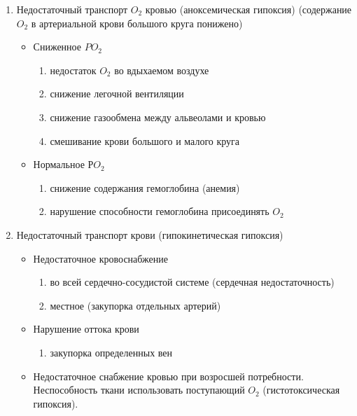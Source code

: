 \documentclass[a4paper,14pt]{extreport}
\begin{document}
\begin{enumerate}
    \item { Недостаточный транспорт $O_2$ кровью (аноксемическая гипоксия) (содержание $O_2$ в артериальной крови большого круга понижено)
        \begin{itemize}
        \item {Сниженное $PO_2$
        \begin{enumerate}
            \item недостаток $O_2$ во вдыхаемом воздухе
            \item снижение легочной вентиляции
            \item снижение газообмена между альвеолами и кровью
            \item смешивание крови большого и малого круга
        \end{enumerate}
        }
        \item {Нормальное $РO_2$
        \begin{enumerate}
            \item снижение содержания гемоглобина (анемия)
            \item нарушение способности гемоглобина присоединять $O_2$
        \end{enumerate}
        }
        \end{itemize}
    }
    \item { Недостаточный транспорт крови (гипокинетическая гипоксия)
        \begin{itemize}
        \item {Недостаточное кровоснабжение
        \begin{enumerate}
            \item во всей сердечно-сосудистой системе (сердечная недостаточность) 
            \item местное (закупорка отдельных артерий)
        \end{enumerate}
        }
        \item { Нарушение оттока крови
        \begin{enumerate}
            \item закупорка определенных вен
        \end{enumerate}
        }
        \item { Недостаточное снабжение кровью при возросшей потребности.
    Неспособность ткани использовать  поступающий $O_2$ (гистотоксическая  гипоксия).
        }        
        \end{itemize}    
    }
\end{enumerate}
\end{document}
